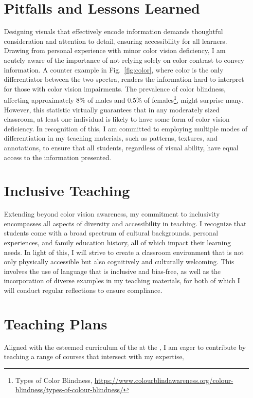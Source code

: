\section{Pitfalls and Lessons Learned}
Designing visuals that effectively encode information demands thoughtful consideration and attention to detail, ensuring accessibility for all learners. Drawing from personal experience with minor color vision deficiency, I am acutely aware of the importance of not relying solely on color contrast to convey information. A counter example in Fig.~\ref{fig:color}, where color is the only differentiator between the two spectra, renders the information hard to interpret for those with color vision impairments. The prevalence of color blindness, affecting approximately 8\% of males and 0.5\% of females\footnote{Types of Color Blindness, \url{https://www.colourblindawareness.org/colour-blindness/types-of-colour-blindness/}}, might surprise many. However, this statistic virtually guarantees that in any moderately sized classroom, at least one individual is likely to have some form of color vision deficiency. In recognition of this, I am committed to employing multiple modes of differentiation in my teaching materials, such as patterns, textures, and annotations, to ensure that all students, regardless of visual ability, have equal access to the information presented.

\section{Inclusive Teaching}
Extending beyond color vision awareness, my commitment to inclusivity encompasses all aspects of diversity and accessibility in teaching. I recognize that students come with a broad spectrum of cultural backgrounds, personal experiences, and family education history, all of which impact their learning needs. In light of this, I will strive to create a classroom environment that is not only physically accessible but also cognitively and culturally welcoming. This involves the use of language that is inclusive and bias-free, as well as the incorporation of diverse examples in my teaching materials, for both of which I will conduct regular reflections to ensure compliance.


\section{Teaching Plans}
Aligned with the esteemed curriculum of the \appDept{} at the \appSchool{}, I am eager to contribute by teaching a range of courses that intersect with my expertise,%